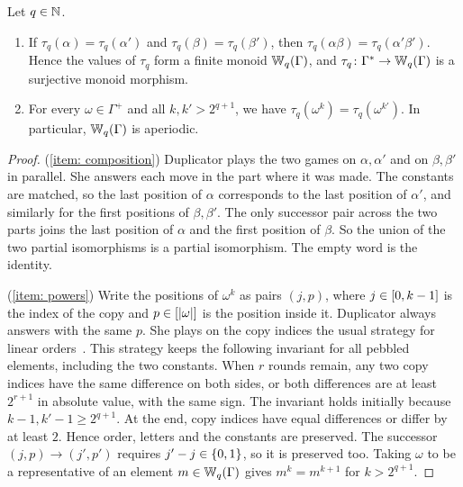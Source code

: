 \begin{lemma}\label{lemma: word types}
  Let $q \in \mathbb{N}$.
  \begin{enumerate}
    \item\label{item: composition} If $\tau_q(\alpha) = \tau_q(\alpha')$ and $\tau_q(\beta) = \tau_q(\beta')$, then $\tau_q(\alpha\beta) = \tau_q(\alpha'\beta')$.
          Hence the values of $\tau_q$ form a finite monoid $\mathbb{W}_{q}(\Gamma)$, and $\tau_q \colon \Gamma^{*} \to \mathbb{W}_{q}(\Gamma)$ is a surjective monoid morphism.
    \item\label{item: powers} For every $\omega \in \Gamma^{+}$ and all $k, k' > 2^{q+1}$, we have $\tau_q(\omega^{k}) = \tau_q(\omega^{k'})$.
          In particular, $\mathbb{W}_{q}(\Gamma)$ is aperiodic.
  \end{enumerate}
\end{lemma}
\begin{proof}
  (\ref{item: composition})
  Duplicator plays the two games on $\alpha, \alpha'$ and on $\beta, \beta'$ in parallel.
  She answers each move in the part where it was made.
  The constants are matched, so the last position of $\alpha$ corresponds to the last position of $\alpha'$, and similarly for the first positions of $\beta, \beta'$.
  The only successor pair across the two parts joins the last position of $\alpha$ and the first position of $\beta$.
  So the union of the two partial isomorphisms is a partial isomorphism.
  The empty word is the identity.

  (\ref{item: powers})
  Write the positions of $\omega^{k}$ as pairs $(j, p)$, where $j \in [0, k-1]$ is the index of the copy and $p \in [\lvert \omega\rvert]$ is the position inside it.
  Duplicator always answers with the same $p$.
  She plays on the copy indices the usual strategy for linear orders~\cite{ebbinghausFiniteModelTheory1995}.
  This strategy keeps the following invariant for all pebbled elements, including the two constants.
  When $r$ rounds remain, any two copy indices have the same difference on both sides, or both differences are at least $2^{r+1}$ in absolute value, with the same sign.
  The invariant holds initially because $k-1, k'-1 \ge 2^{q+1}$.
  At the end, copy indices have equal differences or differ by at least $2$.
  Hence order, letters and the constants are preserved.
  The successor $(j, p) \to (j', p')$ requires $j' - j \in \{0, 1\}$, so it is preserved too.
  Taking $\omega$ to be a representative of an element $m \in \mathbb{W}_{q}(\Gamma)$ gives $m^{k} = m^{k+1}$ for $k > 2^{q+1}$.
\end{proof}

